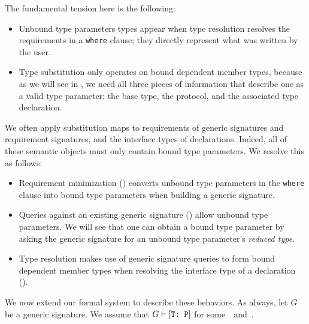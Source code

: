 \documentclass[../generics]{subfiles}
\begin{document}
The fundamental tension here is the following:
\begin{itemize}
\item Unbound type parameters types appear when type resolution resolves the requirements in a \texttt{where} clause; they directly represent what was written by the user.

\item Type substitution only operates on bound dependent member types, because as we will see in , we need all three pieces of information that describe one as a valid type parameter: the base type, the protocol, and the associated type declaration.
\end{itemize}
We often apply substitution maps to requirements of generic signatures and requirement signatures, and the interface types of declarations. Indeed, all of these semantic objects must only contain bound type parameters. We resolve this as follows:
\begin{itemize}
\item Requirement minimization () converts unbound type parameters in the \texttt{where} clause into bound type parameters when building a generic signature.
\item Queries against an existing generic signature () allow unbound type parameters. We will see that one can obtain a bound type parameter by asking the generic signature for an unbound type parameter's \emph{reduced type}.
\item Type resolution makes use of generic signature queries to form bound dependent member types when resolving the interface type of a declaration ().
\end{itemize}

We now extend our formal system to describe these behaviors. As always, let $G$ be a generic signature. We assume that $G\vdash[\texttt{T:~P}]$ for some~\tT\ and~\tP.
\end{document}
